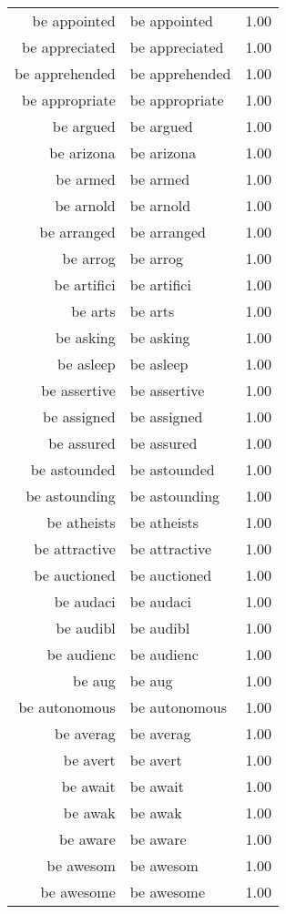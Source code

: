 \begin{table}[ht]
\begin{tabular}{rlr}
  be appointed & be appointed & 1.00 \\ 
  be appreciated & be appreciated & 1.00 \\ 
  be apprehended & be apprehended & 1.00 \\ 
  be appropriate & be appropriate & 1.00 \\ 
  be argued & be argued & 1.00 \\ 
  be arizona & be arizona & 1.00 \\ 
  be armed & be armed & 1.00 \\ 
  be arnold & be arnold & 1.00 \\ 
  be arranged & be arranged & 1.00 \\ 
  be arrog & be arrog & 1.00 \\ 
  be artifici & be artifici & 1.00 \\ 
  be arts & be arts & 1.00 \\ 
  be asking & be asking & 1.00 \\ 
  be asleep & be asleep & 1.00 \\ 
  be assertive & be assertive & 1.00 \\ 
  be assigned & be assigned & 1.00 \\ 
  be assured & be assured & 1.00 \\ 
  be astounded & be astounded & 1.00 \\ 
  be astounding & be astounding & 1.00 \\ 
  be atheists & be atheists & 1.00 \\ 
  be attractive & be attractive & 1.00 \\ 
  be auctioned & be auctioned & 1.00 \\ 
  be audaci & be audaci & 1.00 \\ 
  be audibl & be audibl & 1.00 \\ 
  be audienc & be audienc & 1.00 \\ 
  be aug & be aug & 1.00 \\ 
  be autonomous & be autonomous & 1.00 \\ 
  be averag & be averag & 1.00 \\ 
  be avert & be avert & 1.00 \\ 
  be await & be await & 1.00 \\ 
  be awak & be awak & 1.00 \\ 
  be aware & be aware & 1.00 \\ 
  be awesom & be awesom & 1.00 \\ 
  be awesome & be awesome & 1.00 \\ 

\end{tabular}
\end{table}
